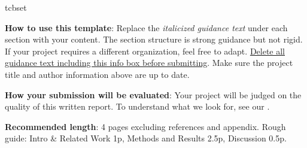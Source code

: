 \ifcsname tcbset\endcsname
\begin{tcolorbox}[colback=black!3,colframe=black!70,boxrule=0.5pt,
                  left=8pt,right=8pt,top=6pt,bottom=6pt]
\textbf{How to use this template}: Replace the \textit{italicized guidance text}
under each section with your content. The section structure is strong guidance
but not rigid. If your project requires a different organization, feel free to
adapt. \underline{Delete all guidance text including this info box before
submitting}. Make sure the project title and author information above are up to
date.

\textbf{How your submission will be evaluated}: Your project will be judged on
the quality of this written report. To understand what we look for, see our
.

\textbf{Recommended length}: 4 pages excluding references and appendix. Rough
guide: Intro \& Related Work 1p, Methods and Results 2.5p, Discussion 0.5p.
\end{tcolorbox}
\fi
